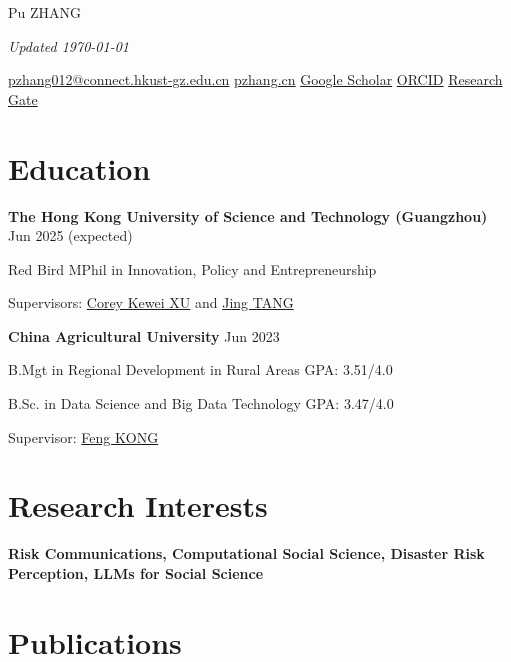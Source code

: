 \documentclass[letterpaper, 11pt]{article}
\newcommand{\sepspace}{\vspace{0.5em}}
\begin{document}
\setlength{\parindent}{0pt}

\begin{center}
    \Huge Pu ZHANG
\end{center}
\hfill{\it\footnotesize Updated \today}
\begin{center}

\href{mailto:pzhang012@connect.hkust-gz.edu.cn}{pzhang012@connect.hkust-gz.edu.cn}
\hspace{0.1in}\href{https://pzhang.cn}{pzhang.cn}
\hspace{0.1in}\href{https://scholar.google.com/citations?user=DBKpQPQAAAAJ}{Google Scholar}
\hspace{0.1in}\href{https://orcid.org/0000-0002-7501-2124}{ORCID}%
\hspace{0.1in}\href{https://www.researchgate.net/profile/Pu-Zhang-33/}{Research Gate}
\end{center}

\section{Education}

\textbf{The Hong Kong University of Science and Technology (Guangzhou)} \hfill Jun 2025 (expected)

Red Bird MPhil in Innovation, Policy and Entrepreneurship

Supervisors: \href{https://facultyprofiles.hkust-gz.edu.cn/faculty-personal-page/XU-Kewei/coreyxu}{Corey Kewei XU} and \href{https://facultyprofiles.hkust-gz.edu.cn/faculty-personal-page/TANG-Jing/jingtang}{Jing TANG} 

\sepspace
\textbf{China Agricultural University} \hfill Jun 2023

B.Mgt in Regional Development in Rural Areas \hfill GPA: 3.51/4.0

B.Sc. in Data Science and Big Data Technology \hfill GPA: 3.47/4.0

Supervisor: \href{https://cohd.cau.edu.cn/art/2020/11/27/art_48059_998984.html}{Feng KONG} 

\section{Research Interests}
\textbf{Risk Communications, Computational Social Science, Disaster Risk Perception, LLMs for Social Science}

\section{Publications}
\end{document}
